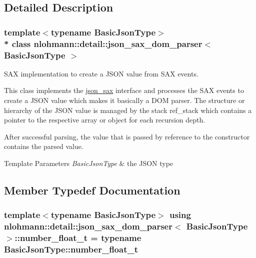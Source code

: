 \subsection{Detailed Description}
\subsubsection*{template$<$typename Basic\+Json\+Type$>$\\*
class nlohmann\+::detail\+::json\+\_\+sax\+\_\+dom\+\_\+parser$<$ Basic\+Json\+Type $>$}

S\+AX implementation to create a J\+S\+ON value from S\+AX events. 

This class implements the \hyperlink{structnlohmann_1_1json__sax}{json\+\_\+sax} interface and processes the S\+AX events to create a J\+S\+ON value which makes it basically a D\+OM parser. The structure or hierarchy of the J\+S\+ON value is managed by the stack {\ttfamily ref\+\_\+stack} which contains a pointer to the respective array or object for each recursion depth.

After successful parsing, the value that is passed by reference to the constructor contains the parsed value.


\begin{DoxyTemplParams}{Template Parameters}
{\em Basic\+Json\+Type} & the J\+S\+ON type \\
\hline
\end{DoxyTemplParams}


\subsection{Member Typedef Documentation}
\subsubsection[{\texorpdfstring{number\+\_\+float\+\_\+t}{number_float_t}}]{\setlength{\rightskip}{0pt plus 5cm}template$<$typename Basic\+Json\+Type$>$ using {\bf nlohmann\+::detail\+::json\+\_\+sax\+\_\+dom\+\_\+parser}$<$ Basic\+Json\+Type $>$\+::{\bf number\+\_\+float\+\_\+t} =  typename Basic\+Json\+Type\+::number\+\_\+float\+\_\+t}\hypertarget{classnlohmann_1_1detail_1_1json__sax__dom__parser_ad8da3aad0147b18b3cb76868480300fe}{}\label{classnlohmann_1_1detail_1_1json__sax__dom__parser_ad8da3aad0147b18b3cb76868480300fe}
